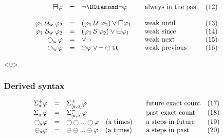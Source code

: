 \begin{frame}
\[\begin{array}{rcl@{\hspace{2em}}ll}
\BBox \varphi &=& \neg \DDiamond \neg \varphi & \text{always in the past} & (12)\\ \\

\varphi_1 \wuntil \varphi_2 &=& (\varphi_1 \until \varphi_2) \vee \Box \varphi_1 & \text{weak until} & (13)\\

\varphi_1 \wsince \varphi_2 &=& (\varphi_1 \since \varphi_2) \vee \BBox \varphi_1 & \text{weak since} & (14)\\

\wnext \varphi &=& \next \varphi \vee \neg \next \true & \text{weak next} & (15)\\

\wprev \varphi &=& \prev \varphi \vee \neg \prev \true & \text{weak previous} & (16)\\

\end{array}
\]

\end{frame}


\begin{frame}<0>
  \frametitle{Derived syntax} \small

\[
\begin{array}{rcl@{\hspace{2em}}ll}

\Sigma^{+}_{a} \varphi  &=& \Sigma^{+}_{[a,a]} \varphi & \text{future exact count} & (17)\\

\Sigma^{-}_{a} \varphi &=& \Sigma^{-}_{[a,a]} \varphi & \text{past exact count} & (18)\\


\Next_a \varphi &=& \Next \Next ... \Next  \varphi  \quad (\text{a times}) & \text{a steps in future} & (19)\\

\prev_a \varphi &=& \prev \prev ... \prev \varphi \quad (\text{a times}) & \text{a steps in past} & (20)\\

\end{array}
\]

\end{frame}


